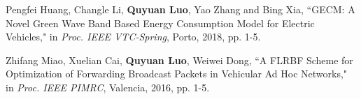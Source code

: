 \documentclass[margin,line]{resume}
\begin{document}
\begin{resume}
\begin{list2}
  \item Pengfei Huang, Changle Li, \textbf{Quyuan Luo}, Yao Zhang and Bing Xia, ``GECM: A Novel Green Wave Band Based Energy Consumption Model for Electric Vehicles," in \emph{Proc. IEEE VTC-Spring}, Porto, 2018, pp. 1-5.

  \item Zhifang Miao, Xuelian Cai, \textbf{Quyuan Luo}, Weiwei Dong, ``A FLRBF Scheme for Optimization of Forwarding Broadcast Packets in Vehicular Ad Hoc Networks," in \emph{Proc. IEEE PIMRC}, Valencia, 2016, pp. 1-5.

  \end{list2}
\end{resume}
\end{document}
